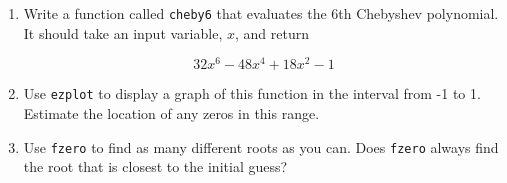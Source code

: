 \documentclass[
]{book}
\numberwithin{Answer}{chapter}
\numberwithin{Exercise}{chapter}
\begin{document}
\begin{ex}

\begin{enumerate}


\item Write a function called {\tt cheby6} that evaluates the
6th Chebyshev polynomial.  It should take an input variable,
$x$, and return

\begin{equation}
32 x^6 - 48 x^4 + 18 x^2 - 1
\end{equation}

\item Use {\tt ezplot} to display a graph of this function in the
interval from -1 to 1.  Estimate the location of any zeros in this
range.

\item Use {\tt fzero} to find as many different roots as you can.
Does {\tt fzero} always find the root that is closest to the initial
guess?

\end{enumerate}

\end{ex}
\end{document}
